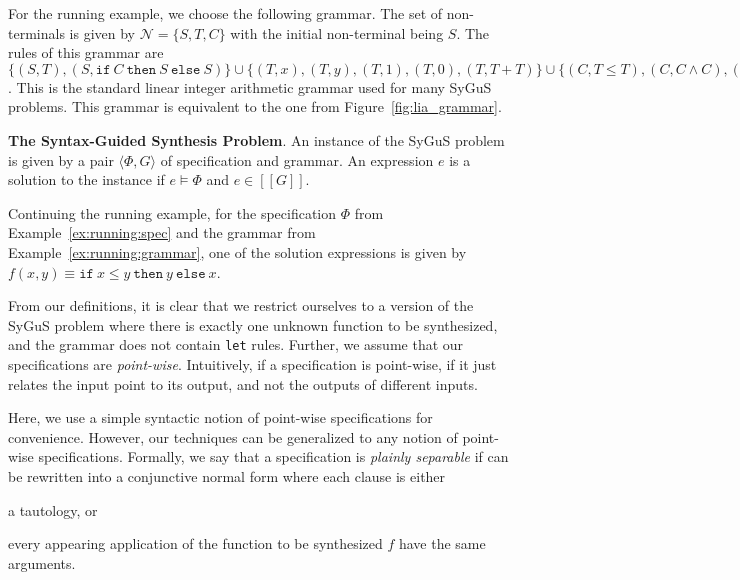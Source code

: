 \documentclass{llncs}
\newcommand\tuple[1]{\langle #1 \rangle}
\newcommand\Expr{e}
\newcommand\Spec{\Phi}
\newcommand\Grammar{G}
\newcommand\sem[1]{[\![ #1 ]\!]}
\newcommand\SynthFun{f}
\newcommand\NonTerminals{\mathcal{N}}
\newcommand\StartSymbol{S}
\newcommand\ITE[3]{\mathtt{if}~#1~\mathtt{then}~#2~\mathtt{else}~#3}
\newcommand{\sygus}{{\sffamily\fontsize{8.5}{10}\selectfont
    SyGuS}\xspace}
\renewcommand{\paragraph}[1]{\par\noindent\textbf{#1}.}
\begin{document}
\begin{example}
  \label{ex:running:grammar}
  For the running example, we choose the following grammar.
  The set of non-terminals is given by $\NonTerminals = \{ \StartSymbol, T, C \}$ with
  the initial non-terminal being $\StartSymbol$.
  The rules of this grammar are $\{ (\StartSymbol, T), (\StartSymbol,
      \ITE{C}{\StartSymbol}{\StartSymbol})
    \} \cup \{ (T, x), (T, y), (T, 1), (T, 0), (T, T + T) \} \cup
        \{ (C, T \leq T), (C, C \wedge C), (C, \neg C) \}$.
  This is the standard linear integer arithmetic grammar used for many
  \sygus problems.
  This grammar is equivalent to the one from
  Figure~\ref{fig:lia_grammar}.
\end{example}

\paragraph{The Syntax-Guided Synthesis Problem}
An instance of the \sygus problem is given by a pair $\tuple { \Spec,
\Grammar }$ of specification and grammar.
An expression $\Expr$ is a solution to the instance if $\Expr \models
\Spec$ and $\Expr \in \sem{\Grammar}$.

\begin{example}
  Continuing the running example, for the specification $\Spec$ from
  Example~\ref{ex:running:spec} and the grammar from
  Example~\ref{ex:running:grammar}, one of the solution expressions is
  given by $\SynthFun(x, y) \equiv \ITE{x \leq y}{y}{x}$.
\end{example}

\vspace*{-3mm}
From our definitions, it is clear that we restrict ourselves to a
version of the \sygus problem where there is exactly one unknown function
to be synthesized, and the grammar does not contain {\tt let} rules.
Further, we assume that our specifications are \emph{point-wise}.
Intuitively, if a specification is point-wise, if it just relates the
input point to its output, and not the outputs of different inputs.

Here, we use a simple syntactic notion of point-wise specifications for
convenience.
However, our techniques can be generalized to any notion of point-wise
specifications.
Formally, we say that a specification is {\em plainly separable} if can
be rewritten into a conjunctive normal form where each clause is either
\begin{inparaenum}[(a)]
\item a tautology, or
\item every appearing application of the function to be synthesized
  $\SynthFun$ have the same arguments.
\end{inparaenum}
\end{document}
